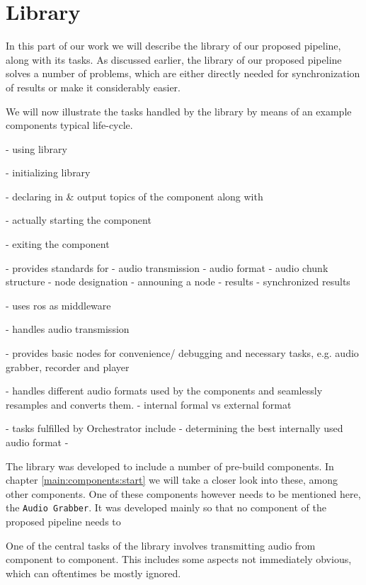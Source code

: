 


\section{Library}
\label{main:lib}
In this part of our work we will describe the library of our proposed pipeline, along with its tasks.
As discussed earlier, the library of our proposed pipeline solves a number of problems, which are either directly needed for synchronization of results or make it considerably easier.


We will now illustrate the tasks handled by the library by means of an example components typical life-cycle.

- using library

- initializing library

- declaring in \& output topics of the component along with 

- actually starting the component

- exiting the component



- provides standards for
	- audio transmission
		- audio format
		- audio chunk structure
	- node designation
	- announing a node
	- results
	- synchronized results

- uses ros as middleware

- handles audio transmission

- provides basic nodes for convenience/ debugging and necessary tasks, e.g. audio grabber, recorder and player

- handles different audio formats used by the components and seamlessly resamples and converts them.
	- internal formal vs external format

- tasks fulfilled by Orchestrator include
	- determining the best internally used audio format
	- 
	
	
The library was developed to include a number of pre-build components.
In chapter \ref{main:components:start} we will take a closer look into these, among other components.
One of these components however needs to be mentioned here, the \texttt{Audio Grabber}.
It was developed mainly so that no component of the proposed pipeline needs to 

One of the central tasks of the library involves transmitting audio from component to component.
This includes some aspects not immediately obvious, which can oftentimes be mostly ignored.

